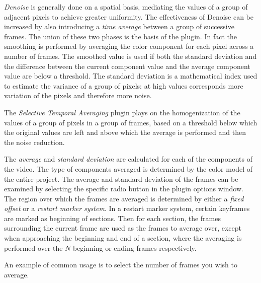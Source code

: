 \textit{Denoise} is generally done on a spatial basis, mediating the values of a group of adjacent pixels to achieve greater uniformity. The effectiveness of Denoise can be increased by also introducing a \textit{time average} between a group of successive frames. The union of these two phases is the basis of the plugin. In fact the smoothing is performed by averaging the color component for each pixel across a number of frames. The smoothed value is used if both the standard deviation and the difference between the current component value and the average component value are below a threshold. The standard deviation is a mathematical index used to estimate the variance of a group of pixels: at high values corresponds more variation of the pixels and therefore more noise.

The \textit{Selective Temporal Averaging} plugin plays on the homogenization of the values of a group of pixels in a group of frames, based on a threshold below which the original values are left and above which the average is performed and then the noise reduction.

The \textit{average} and \textit{standard deviation} are calculated for each of the components of the video. The type of components averaged is determined by the color model of the entire project. The average and standard deviation of the frames can be examined by selecting the specific radio button in the plugin options window.
The region over which the frames are averaged is determined by either a \textit{fixed offset} or a \textit{restart marker system}. In a restart marker system, certain keyframes are marked as beginning of sections. Then for each section, the frames surrounding the current frame are used as the frames to average over, except when approaching the beginning and end of a section, where the averaging is performed over the $N$ beginning or ending frames respectively.

An example of common usage is to select the number of frames you wish to average.

